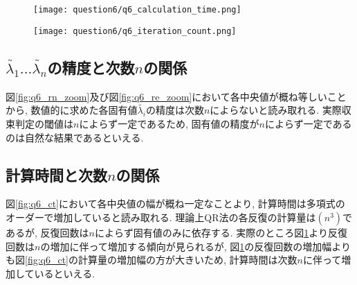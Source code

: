 \documentclass[uplatex,a4j]{jsarticle}
\begin{document}
\begin{figure}[htbp]
  \centering

  \begin{minipage}[t]{0.48\textwidth}
    \centering
    \texttt{[image: question6/q6\_calculation\_time.png]}
    \label{fig:q6_ct}
  \end{minipage}
  \hfill
  \begin{minipage}[t]{0.48\textwidth}
    \centering
    \texttt{[image: question6/q6\_iteration\_count.png]}
    \label{fig:q6_ic}
  \end{minipage}
  
\end{figure}


\newpage
\subsection{$\tilde{\lambda_1} ... \tilde{\lambda_n}$の精度と次数$n$の関係}
\label{sec:q6_2}
図\ref{fig:q6_rn_zoom}及び図\ref{fig:q6_re_zoom}において各中央値が概ね等しいことから, 
数値的に求めた各固有値$\tilde{\lambda_i}$の精度は次数$n$によらないと読み取れる.
実際収束判定の閾値は$n$によらず一定であるため, 
固有値の精度が$n$によらず一定であるのは自然な結果であるといえる. 

\subsection{計算時間と次数$n$の関係}
\label{sec:q6_3}
図\ref{fig:q6_ct}において各中央値の幅が概ね一定なことより, 
計算時間は多項式のオーダーで増加していると読み取れる. 
理論上QR法の各反復の計算量は$(n^3)$であるが, 反復回数は$n$によらず固有値のみに依存する. 
実際のところ図\ref{fig:q6_ic}より反復回数は$n$の増加に伴って増加する傾向が見られるが, 
図\ref{fig:q6_ic}の反復回数の増加幅よりも図\ref{fig:q6_ct}の計算量の増加幅の方が大きいため, 
計算時間は次数$n$に伴って増加しているといえる. 
\end{document}
